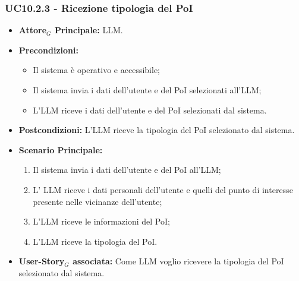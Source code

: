 \documentclass[11pt]{article}
\begin{document}
\begin{justify}
\subsubsection{\textbf{UC10.2.3 - Ricezione tipologia del PoI}}
\begin{itemize}
    \item \textbf{Attore$_G$ Principale:} LLM.
    \item \textbf{Precondizioni:} 
        \begin{itemize}
          \item Il sistema è operativo e accessibile;
          \item Il sistema invia i dati dell'utente e del PoI selezionati all'LLM;
            \item L'LLM riceve i dati dell'utente e del PoI selezionati dal sistema.
        \end{itemize}
      \item \textbf{Postcondizioni:} L'LLM riceve la tipologia del PoI selezionato dal sistema.
    \item \textbf{Scenario Principale:} 
        \begin{enumerate}
          \item Il sistema invia i dati dell'utente e del PoI all'LLM;
        \item L' LLM riceve i dati personali dell'utente e quelli del punto di interesse presente nelle vicinanze dell'utente;
          \item L'LLM riceve le informazioni del PoI;
          \item L'LLM riceve la tipologia del PoI.
        \end{enumerate}
      \item \textbf{User-Story$_G$ associata:} Come LLM voglio ricevere la tipologia del PoI selezionato dal sistema.
\end{itemize}

\end{justify}
\end{document}
